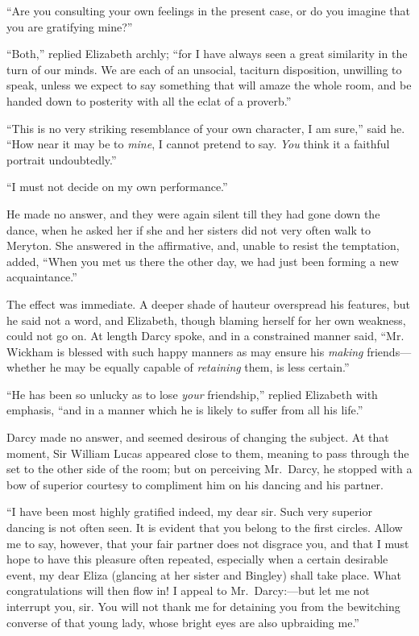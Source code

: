 ``Are you consulting your own feelings in the present case, or do
you imagine that you are gratifying mine?''

``Both,'' replied Elizabeth archly; ``for I have always seen a great
similarity in the turn of our minds.  We are each of an unsocial,
taciturn disposition, unwilling to speak, unless we expect to say
something that will amaze the whole room, and be handed down
to posterity with all the eclat of a proverb.''

``This is no very striking resemblance of your own character,
I am sure,'' said he.  ``How near it may be to \emph{mine}, I cannot
pretend to say.  \emph{You} think it a faithful portrait undoubtedly.''

``I must not decide on my own performance.''

He made no answer, and they were again silent till they had gone
down the dance, when he asked her if she and her sisters did not
very often walk to Meryton.  She answered in the affirmative,
and, unable to resist the temptation, added, ``When you met us
there the other day, we had just been forming a new acquaintance.''

The effect was immediate.  A deeper shade of hauteur overspread
his features, but he said not a word, and Elizabeth, though
blaming herself for her own weakness, could not go on.  At
length Darcy spoke, and in a constrained manner said, ``Mr.\ %
Wickham is blessed with such happy manners as may ensure his
\emph{making} friends---whether he may be equally capable of \emph{retaining}
them, is less certain.''

``He has been so unlucky as to lose \emph{your} friendship,'' replied
Elizabeth with emphasis, ``and in a manner which he is likely to
suffer from all his life.''

Darcy made no answer, and seemed desirous of changing the
subject.  At that moment, Sir William Lucas appeared close to
them, meaning to pass through the set to the other side of the
room; but on perceiving Mr.\ Darcy, he stopped with a bow of
superior courtesy to compliment him on his dancing and his
partner.

``I have been most highly gratified indeed, my dear sir.  Such
very superior dancing is not often seen.  It is evident that you
belong to the first circles.  Allow me to say, however, that your
fair partner does not disgrace you, and that I must hope to have
this pleasure often repeated, especially when a certain desirable
event, my dear Eliza (glancing at her sister and Bingley) shall
take place.  What congratulations will then flow in!  I appeal to
Mr.\ Darcy:---but let me not interrupt you, sir.  You will not
thank me for detaining you from the bewitching converse of that
young lady, whose bright eyes are also upbraiding me.''

